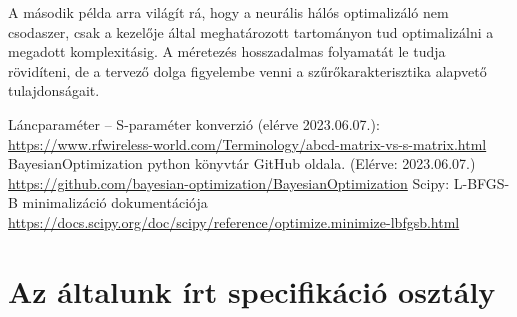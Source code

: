         
        A második példa arra világít rá, hogy a neurális hálós optimalizáló nem csodaszer, csak a kezelője által meghatározott tartományon tud optimalizálni a megadott komplexitásig. A méretezés hosszadalmas folyamatát le tudja rövidíteni, de a tervező dolga figyelembe venni a szűrőkarakterisztika alapvető tulajdonságait.

\clearpage
\begin{thebibliography}{9}
     Láncparaméter -- S-paraméter konverzió (elérve 2023.06.07.): \url{https://www.rfwireless-world.com/Terminology/abcd-matrix-vs-s-matrix.html}
     BayesianOptimization python könyvtár GitHub oldala. (Elérve: 2023.06.07.) \url{https://github.com/bayesian-optimization/BayesianOptimization}
     Scipy: L-BFGS-B minimalizáció dokumentációja \url{https://docs.scipy.org/doc/scipy/reference/optimize.minimize-lbfgsb.html}
\end{thebibliography}

\clearpage
\appendix
\section{Az általunk írt specifikáció osztály}
	

